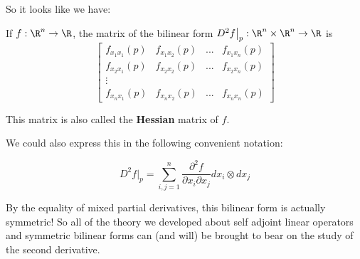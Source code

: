 \documentclass{ximera}
\begin{document}
 So it looks like we have:
 
 \begin{theorem}
 	If $f: \R^n \to \R$, the matrix of the bilinear form $D^2f\big|_p : \R^n \times \R^n \to \R$ is \[\begin{bmatrix}
		 f_{x_1x_1}(p) &  f_{x_1x_2}(p) & ... &  f_{x_1x_n}(p)\\ f_{x_2x_1}(p) &  f_{x_2x_2}(p) & ... &  f_{x_2x_n}(p)\\ \vdots \\ f_{x_nx_1}(p) &  f_{x_nx_2}(p) & ... &  f_{x_nx_n}(p)
 \end{bmatrix}\]
 
 This matrix is also called the \textbf{Hessian} matrix of $f$.
 
 We could also express this in the following convenient notation:
 
 \[D^2f\big|_p  = \sum_{i,j=1}^n \frac{\partial^2 f}{\partial x_i \partial x_j} dx_i \otimes dx_j\]
 \end{theorem}
 
 By the equality of mixed partial derivatives, this bilinear form is actually symmetric!  So all of the theory we developed about self adjoint linear operators and symmetric bilinear forms
 can (and will) be brought to bear on the study of the second derivative.
 
\end{document}
